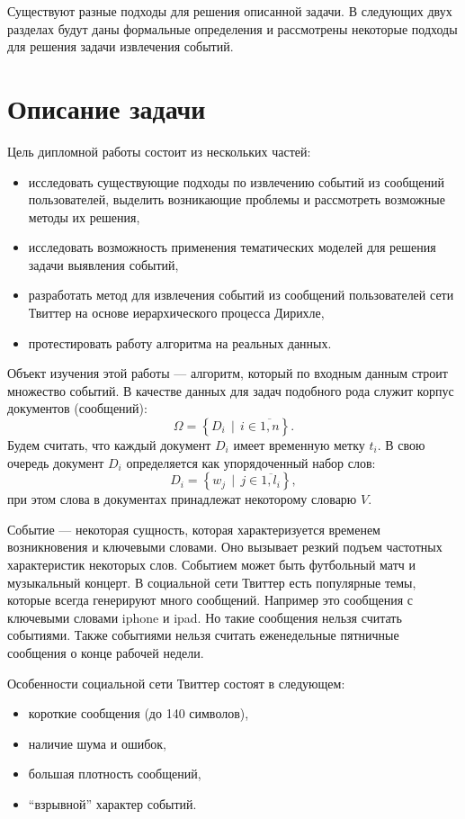 \documentclass[12pt, a4paper]{article}
\DeclareMathOperator{\svert}{\,\vert\,}
\begin{document}
	Существуют разные подходы для решения описанной задачи. В следующих двух разделах будут даны формальные определения и рассмотрены некоторые подходы для решения задачи извлечения событий.
	
  \section{Описание задачи}
	Цель дипломной работы состоит из нескольких частей:
\begin{itemize}
\item исследовать существующие подходы по извлечению событий из сообщений пользователей, выделить возникающие проблемы и рассмотреть возможные методы их решения,
\item исследовать возможность применения тематических моделей для решения задачи выявления событий,
\item разработать метод для извлечения событий из сообщений пользователей сети Твиттер на основе иерархического процесса Дирихле,
\item протестировать работу алгоритма на реальных данных.
\end{itemize}	  
  
  Объект изучения этой работы --- алгоритм, который по входным данным строит множество событий. В качестве данных для задач подобного рода служит корпус документов (сообщений):
\begin{equation}
  \Omega = \left\{D_i \svert i \in \overline{1,n} \right\}.
  \end{equation}  
  Будем считать, что каждый документ $D_i$ имеет временную метку $t_i$. В свою очередь документ $D_i$ определяется как упорядоченный набор слов:
\begin{equation}
  D_i = \left\{w_j \svert j \in \overline{ 1, l_i } \right\},
  \end{equation}  
   при этом слова в документах принадлежат некоторому словарю $V$. 
  
  Событие --- некоторая сущность, которая характеризуется временем возникновения и ключевыми словами. Оно вызывает резкий подъем частотных характеристик некоторых слов. Событием может быть футбольный матч и музыкальный концерт. В социальной сети Твиттер есть популярные темы, которые всегда генерируют много сообщений. Например это сообщения с ключевыми словами iphone и ipad. Но такие сообщения нельзя считать событиями. Также событиями нельзя считать еженедельные пятничные сообщения о конце рабочей недели\cite{waim13}.
  
  Особенности социальной сети Твиттер состоят в следующем:
  \begin{itemize}
  \item короткие сообщения (до 140 символов),
  \item наличие шума и ошибок,
  \item большая плотность сообщений,
  \item ``взрывной'' характер событий.
  \end{itemize}
  
\end{document}
